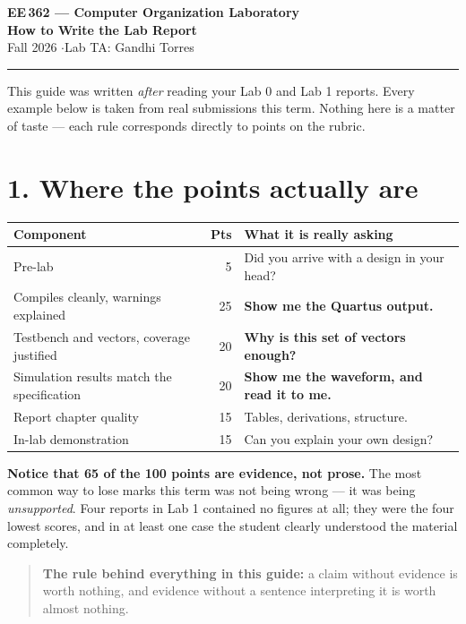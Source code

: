 \documentclass[11pt]{article}
\newcommand{\hr}{\vspace{2pt}\hrule\vspace{6pt}}
\begin{document}
\begin{center}
{\Large\bfseries EE\,362 --- Computer Organization Laboratory}\\[2pt]
{\large\bfseries How to Write the Lab Report}\\[4pt]
Fall 2026 \quad$\cdot$\quad Lab TA: Gandhi Torres
\end{center}
\hr

This guide was written \emph{after} reading your Lab 0 and Lab 1 reports. Every
example below is taken from real submissions this term. Nothing here is a matter of
taste --- each rule corresponds directly to points on the rubric.

\section*{1. Where the points actually are}

\begin{center}
\begin{tabular}{lrl}
\toprule
Component & Pts & What it is really asking \\
\midrule
Pre-lab & 5 & Did you arrive with a design in your head? \\
Compiles cleanly, warnings explained & 25 & \textbf{Show me the Quartus output.} \\
Testbench and vectors, coverage justified & 20 & \textbf{Why is this set of vectors enough?} \\
Simulation results match the specification & 20 & \textbf{Show me the waveform, and read it to me.} \\
Report chapter quality & 15 & Tables, derivations, structure. \\
In-lab demonstration & 15 & Can you explain your own design? \\
\bottomrule
\end{tabular}
\end{center}

\textbf{Notice that 65 of the 100 points are evidence, not prose.} The most common
way to lose marks this term was not being wrong --- it was being \emph{unsupported}.
Four reports in Lab 1 contained no figures at all; they were the four lowest scores,
and in at least one case the student clearly understood the material completely.

\begin{quote}
\textbf{The rule behind everything in this guide:} a claim without evidence is
worth nothing, and evidence without a sentence interpreting it is worth almost
nothing.
\end{quote}
\end{document}
